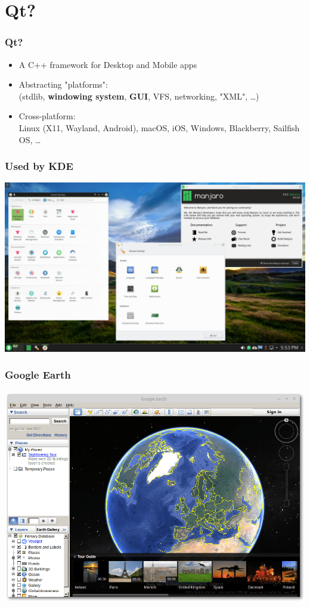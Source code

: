 \section{Qt?} 

\begin{frame}
  \frametitle{Qt?}
  \begin{itemize}
  \item A C++ framework for Desktop and Mobile apps\pause
  \item Abstracting "platforms": \\
    (stdlib, {\bf windowing system}, {\bf GUI}, VFS, networking, "XML", \ldots)\pause
  \item Cross-platform: \\
    Linux (X11, Wayland, Android), macOS, iOS, Windows, Blackberry, Sailfish OS, \ldots
  \end{itemize}
\end{frame}

\begin{frame}
  \frametitle{Used by KDE}
  \includegraphics[width=\textwidth]{apps_kde}
\end{frame}

\begin{frame}
  \frametitle{Google Earth}
  \includegraphics[height=0.9\textheight]{apps_earth}
\end{frame}

